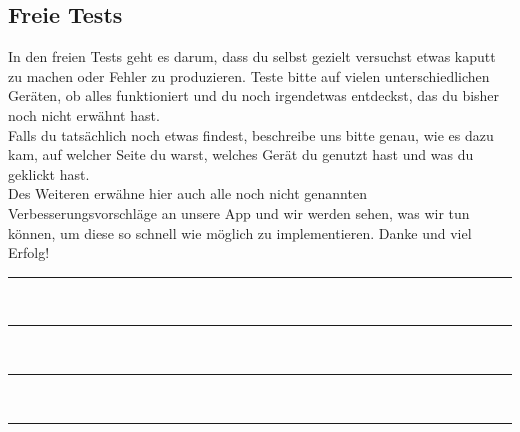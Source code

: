 \subsection{Freie Tests}
In den freien Tests geht es darum, dass du selbst gezielt versuchst etwas kaputt zu machen oder Fehler zu produzieren. Teste bitte auf vielen unterschiedlichen Geräten, ob alles funktioniert und du noch irgendetwas entdeckst, das du bisher noch nicht erwähnt hast. \\
Falls du tatsächlich noch etwas findest, beschreibe uns bitte genau, wie es dazu kam, auf welcher Seite du warst, welches Gerät du genutzt hast und was du geklickt hast.\\
Des Weiteren erwähne hier auch alle noch nicht genannten Verbesserungsvorschläge an unsere App und wir werden sehen, was wir tun können, um diese so schnell wie möglich zu implementieren. Danke und viel Erfolg!\\

\noindent\rule{\textwidth}{0.4pt}\\ %
\noindent\rule{\textwidth}{0.4pt}\\
\noindent\rule{\textwidth}{0.4pt}\\
\noindent\rule{\textwidth}{0.4pt}\\
